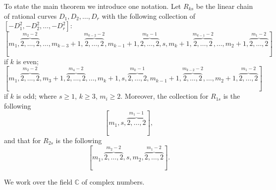 \documentclass[10pt,oneside,reqno]{amsart}
\newcommand{\cc}{\mathbb{C}}
\theoremstyle{definition}
\theoremstyle{remark}
\numberwithin{equation}{section}
\begin{document}
To state the main theorem we introduce one notation.
Let $R_{ks}$ be the linear chain of rational curves $D_1,D_2,\ldots, D_r$ with the following collection of $[-D_1^2,-D_2^2,\ldots,-D_r^2]:$
\[ [m_1,\overbrace{2,\ldots,2}^{m_2-2}, \ldots,
m_{k-3}+1, \overbrace{2,\ldots,2}^{m_{k-2}-2},m_{k-1}+1,\overbrace{2,\ldots,2}^{m_k-1},s,m_k+1, \overbrace{2,\ldots,2}^{m_{k-1}-2}, \ldots,m_2+1,\overbrace{2,\ldots,2}^{m_1-2}] \]
if $k$ is even;
\[ [m_1,\overbrace{2,\ldots,2}^{m_2-2},  m_3+1,\overbrace{2,\ldots,2}^{m_4-2}, \ldots,m_k+1,s,
\overbrace{2,\ldots,2}^{m_k-1}, m_{k-1}+1, \overbrace{2,\ldots,2}^{m_{k-2}-2}, \ldots,
m_2+1,\overbrace{2,\ldots,2}^{m_1-2}] \]
if $k$ is odd; where $s\geq 1$, $k\geq 3$, $m_i\geq 2$.
Moreover, the collection for $R_{1s}$ is the following $$[m_1,s,\overbrace{2,\ldots,2}^{m_1-1}],$$
and that for $R_{2s}$ is the following $$[m_1,\overbrace{2,\ldots,2}^{m_2-2},s,m_2,\overbrace{2,\ldots,2}^{m_1-2}].$$


We work over the field $\cc$ of complex numbers.
\end{document}
